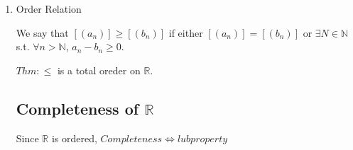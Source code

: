\documentclass[twoside]{article}
\newcounter{lecnum}
\newcommand{\N}{\mathbb{N}}
\newcommand{\Q}{\mathbb{Q}}
\newtheorem{theorem}{Theorem}[lecnum]
\newcommand\R{\mathbb{R}}
\begin{document}
\begin{enumerate}
    Prop: $b_n$ is cauchy. 

    $|b_m - b_n| = |\frac1{a_m} - \frac1{a_n}| = |\frac{a_n - a_m}{a_ma_n}|$

    \begin{theorem}
        $\R$ is a field. 
    
        ($\Q_p$ is a field.)     
    \end{theorem}
    
    \item Order Relation 
    
    We say that $[(a_n)] \geq [(b_n)]$ if either $[(a_n)] = [(b_n)]$ or $\exists N \in \N$ s.t. $\forall n > \N$, $a_n - b_n \geq 0$. 

    $Thm: \leq $ is a total oreder on $\R$. 

    \subsection{Completeness of $\R$}

    Since $\R$ is ordered, $Completeness \iff lub property$

\end{enumerate}
\end{document}
